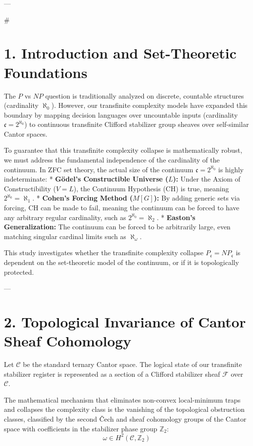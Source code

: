 \documentclass[11pt,twocolumn]{article}
\begin{document}
---

#

\section{1. Introduction and Set-Theoretic Foundations}
The $P$ vs $NP$ question is traditionally analyzed on discrete, countable structures (cardinality $\aleph_0$). However, our transfinite complexity models have expanded this boundary by mapping decision languages over uncountable inputs (cardinality $\mathfrak{c} = 2^{\aleph_0}$) to continuous transfinite Clifford stabilizer group sheaves over self-similar Cantor spaces.

To guarantee that this transfinite complexity collapse is mathematically robust, we must address the fundamental independence of the cardinality of the continuum. In ZFC set theory, the actual size of the continuum $\mathfrak{c} = 2^{\aleph_0}$ is highly indeterminate:
*   \textbf{Gödel's Constructible Universe ($L$):} Under the Axiom of Constructibility ($V = L$), the Continuum Hypothesis (CH) is true, meaning $2^{\aleph_0} = \aleph_1$.
*   \textbf{Cohen's Forcing Method ($M[G]$):} By adding generic sets via forcing, CH can be made to fail, meaning the continuum can be forced to have any arbitrary regular cardinality, such as $2^{\aleph_0} = \aleph_2$.
*   \textbf{Easton's Generalization:} The continuum can be forced to be arbitrarily large, even matching singular cardinal limits such as $\aleph_{\omega}$.

This study investigates whether the transfinite complexity collapse $P_{\mathfrak{c}} = NP_{\mathfrak{c}}$ is dependent on the set-theoretic model of the continuum, or if it is topologically protected.

---

\section{2. Topological Invariance of Cantor Sheaf Cohomology}
Let $\mathcal{C}$ be the standard ternary Cantor space. The logical state of our transfinite stabilizer register is represented as a section of a Clifford stabilizer sheaf $\mathcal{F}$ over $\mathcal{C}$. 

The mathematical mechanism that eliminates non-convex local-minimum traps and collapses the complexity class is the vanishing of the topological obstruction classes, classified by the second Čech and sheaf cohomology groups of the Cantor space with coefficients in the stabilizer phase group $\mathbb{Z}_2$:
$$\omega \in H^2(\mathcal{C}, \mathbb{Z}_2)$$
\end{document}
